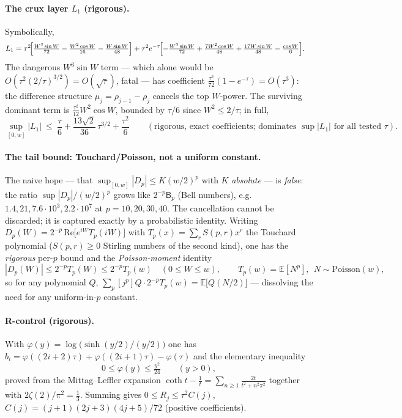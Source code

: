 \paragraph{The crux layer $L_1$ (rigorous).} Symbolically,
\begin{align*}
  L_1&=\tau^2\!\Bigl[\tfrac{W^3\sin W}{72}-\tfrac{W^2\cos W}{16}-\tfrac{W\sin W}{48}\Bigr]
   +\tau^2 e^{-\tau}\!\Bigl[-\tfrac{W^3\sin W}{72}+\tfrac{7W^2\cos W}{48}+\tfrac{17W\sin W}{48}-\tfrac{\cos W}{6}\Bigr].
\end{align*}
The dangerous $W^3\sin W$ term --- which alone would be $O(\tau^2(2/\tau)^{3/2})=O(\sqrt\tau)$,
fatal --- has coefficient $\tfrac{\tau^2}{72}(1-e^{-\tau})=O(\tau^3)$: the difference
structure $\mu_j=\rho_{j-1}-\rho_j$ cancels the top $W$-power. The surviving dominant term
is $\tfrac{\tau^2}{12}W^2\cos W$, bounded by $\tau/6$ since $W^2\le 2/\tau$; in full,
\begin{equation}\label{eq:L1bound}
  \sup_{[0,w]}|L_1|\ \le\ \frac{\tau}{6}+\frac{13\sqrt2}{36}\,\tau^{3/2}+\frac{\tau^2}{6}
  \qquad(\text{rigorous, exact coefficients; dominates }\sup|L_1|\text{ for all tested }\tau).
\end{equation}

\paragraph{The tail bound: Touchard/Poisson, not a uniform constant.} The naive hope ---
that $\sup_{[0,w]}|D_p|\le K(w/2)^p$ with $K$ \emph{absolute} --- is \emph{false}: the ratio
$\sup|D_p|/(w/2)^p$ grows like $2^{-p}\mathsf B_p$ (Bell numbers), e.g.\ $1.4,21,7.6\!\cdot\!10^3,
2.2\!\cdot\!10^7$ at $p=10,20,30,40$. The cancellation cannot be discarded; it is captured exactly
by a probabilistic identity. Writing $D_p(W)=2^{-p}\,\mathrm{Re}\bigl[e^{iW}T_p(iW)\bigr]$ with
$T_p(x)=\sum_r S(p,r)x^r$ the Touchard polynomial ($S(p,r)\ge0$ Stirling numbers of the second
kind), one has the \emph{rigorous} per-$p$ bound and the \emph{Poisson-moment} identity
\begin{equation}\label{eq:touchard}
  |D_p(W)|\le 2^{-p}T_p(W)\le 2^{-p}T_p(w)\quad(0\le W\le w),\qquad
  T_p(w)=\mathbb E[N^{p}],\ \ N\sim\mathrm{Poisson}(w),
\end{equation}
so for any polynomial $Q$, $\sum_p[j^p]Q\cdot 2^{-p}T_p(w)=\mathbb E\bigl[Q(N/2)\bigr]$ ---
dissolving the need for any uniform-in-$p$ constant.

\paragraph{R-control (rigorous).} With $\varphi(y)=\log\!\bigl(\sinh(y/2)/(y/2)\bigr)$ one has
$b_i=\varphi((2i{+}2)\tau)+\varphi((2i{+}1)\tau)-\varphi(\tau)$ and the elementary inequality
\begin{equation}\label{eq:phibound}
  0\le\varphi(y)\le \tfrac{y^2}{24}\qquad(y>0),
\end{equation}
proved from the Mittag--Leffler expansion $\coth t-\tfrac1t=\sum_{n\ge1}\tfrac{2t}{t^2+n^2\pi^2}$
together with $2\zeta(2)/\pi^2=\tfrac13$. Summing gives $0\le R_j\le\tau^2 C(j)$,
$C(j)=(j+1)(2j+3)(4j+5)/72$ (positive coefficients).

